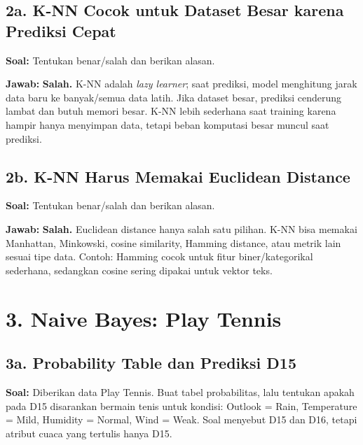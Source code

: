 \documentclass[10pt,a4paper,twocolumn]{article}
\newcommand{\jawab}{\textbf{Jawab: }}
\newcommand{\soal}{\textbf{Soal: }}
\begin{document}
\subsection*{2a. K-NN Cocok untuk Dataset Besar karena Prediksi Cepat}
\soal Tentukan benar/salah dan berikan alasan.

\jawab \textbf{Salah.} K-NN adalah \textit{lazy learner}; saat prediksi, model menghitung jarak data baru ke banyak/semua data latih. Jika dataset besar, prediksi cenderung lambat dan butuh memori besar.
K-NN lebih sederhana saat training karena hampir hanya menyimpan data, tetapi beban komputasi besar muncul saat prediksi.

\subsection*{2b. K-NN Harus Memakai Euclidean Distance}
\soal Tentukan benar/salah dan berikan alasan.

\jawab \textbf{Salah.} Euclidean distance hanya salah satu pilihan. K-NN bisa memakai Manhattan, Minkowski, cosine similarity, Hamming distance, atau metrik lain sesuai tipe data. Contoh: Hamming cocok untuk fitur biner/kategorikal sederhana, sedangkan cosine sering dipakai untuk vektor teks.

\section*{3. Naive Bayes: Play Tennis}

\subsection*{3a. Probability Table dan Prediksi D15}
\soal Diberikan data Play Tennis. Buat tabel probabilitas, lalu tentukan apakah pada D15 disarankan bermain tenis untuk kondisi: Outlook = Rain, Temperature = Mild, Humidity = Normal, Wind = Weak. Soal menyebut D15 dan D16, tetapi atribut cuaca yang tertulis hanya D15.
\end{document}
